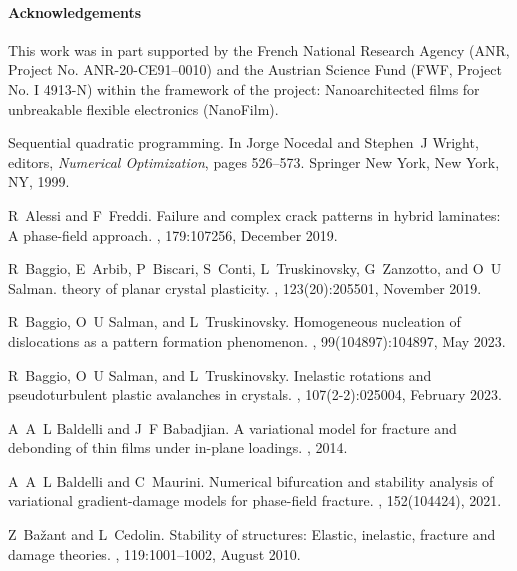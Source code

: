 \documentclass[10pt]{article}
\begin{document}
\paragraph{Acknowledgements} This work was in part supported by the French National Research Agency (ANR, Project No. ANR-20-CE91–0010) and the Austrian Science Fund (FWF, Project No. I 4913-N) within the framework of the project: Nanoarchitected films for unbreakable flexible electronics (NanoFilm).
%



 
%
%

%
\begin{thebibliography}{10}

Sequential quadratic programming.
\newblock In Jorge Nocedal and Stephen~J Wright, editors, {\em Numerical Optimization}, pages 526--573. Springer New York, New York, NY, 1999.

R~Alessi and F~Freddi.
\newblock Failure and complex crack patterns in hybrid laminates: A phase-field approach.
, 179:107256, December 2019.

R~Baggio, E~Arbib, P~Biscari, S~Conti, L~Truskinovsky, G~Zanzotto, and O~U Salman.
 theory of planar crystal plasticity.
, 123(20):205501, November 2019.

R~Baggio, O~U Salman, and L~Truskinovsky.
\newblock Homogeneous nucleation of dislocations as a pattern formation phenomenon.
, 99(104897):104897, May 2023.

R~Baggio, O~U Salman, and L~Truskinovsky.
\newblock Inelastic rotations and pseudoturbulent plastic avalanches in crystals.
, 107(2-2):025004, February 2023.

A~A~L Baldelli and J~F Babadjian.
\newblock A variational model for fracture and debonding of thin films under in-plane loadings.
, 2014.

A~A~L Baldelli and C~Maurini.
\newblock Numerical bifurcation and stability analysis of variational gradient-damage models for phase-field fracture.
, 152(104424), 2021.

Z~Ba{\v z}ant and L~Cedolin.
\newblock Stability of structures: Elastic, inelastic, fracture and damage theories.
, 119:1001--1002, August 2010.


\end{thebibliography}
\end{document}
